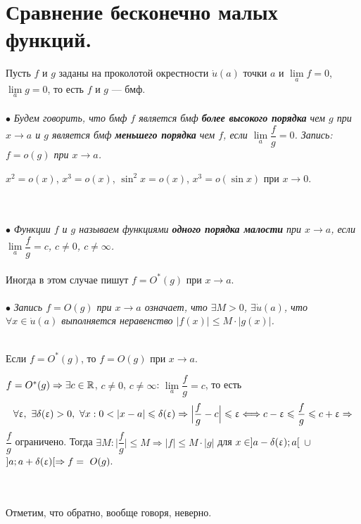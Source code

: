 \section{Сравнение бесконечно малых функций.}
Пусть $f$ и $g$ заданы на проколотой окрестности $\dot{u}(a)$ точки $a$ и $\lim\limits_{a}f = 0$, $\lim\limits_{a}g = 0$, то есть $f$ и $g$ --- бмф.\\\\
$\bullet$ \textit{Будем говорить, что бмф $f$ является бмф \textbf{более высокого порядка} чем $g$ при $x \to a$ и $g$ является бмф \textbf{меньшего порядка} чем $f$, если $\lim\limits_{a}\dfrac{f}{g} = 0$. Запись: $f = o(g)$ при $x\to a$.}\\
\begin{example}
	$x ^ 2 = o (x)$, $x^3 = o(x)$, $\sin ^2 x = o(x)$, $x^3 = o(\sin x)$ при $x\to 0$.
\end{example}\\\\
$\bullet$ \textit{Функции $f$ и $g$ называем функциями \textbf{одного порядка малости} при $x \to a$, если $\lim\limits_{a}\dfrac{f}{g} = c$, $c \ne 0$, $c \ne \infty$.}\\\\
Иногда в этом случае пишут $f = O^*(g)$ при $x \to a$.\\\\
$\bullet$ \textit{Запись $f = O(g)$ при $x\to a$ означает, что $\exists M> 0 $, $\exists\dot{u}(a)$, что $\forall x \in \dot{u}(a)$ выполняется неравенство $|f(x)| \leqslant M\cdot|g(x)|$.}\\\\
\begin{theorem}
	Если $f = O^*(g)$, то $f = O(g)$ при $x\to a$.
\end{theorem}\begin{Proof}
	$f = O^*(g)\Rightarrow \exists c \in \mathbb{R}$, $c \ne 0$, $c \ne \infty$: $\lim\limits_{a}\dfrac{f}{g} = c$, то есть $$\forall \upvarepsilon,\ \exists \delta(\upvarepsilon) > 0,\ \forall x : 0 < |x - a| \leqslant \delta(\upvarepsilon)\Rightarrow \Big|\dfrac{f}{g} - c\Big|\leqslant \upvarepsilon \Longleftrightarrow c - \upvarepsilon \leqslant \dfrac{f}{g} \leqslant c + \upvarepsilon\Rightarrow$$
	$\dfrac{f}{g}$ ограничено. Тогда $\exists M : \Big|\dfrac{f}{g}\Big| \leq M \Rightarrow |f| \leq M \cdot |g|$ для $x \in ]a - \delta(\upvarepsilon); a[$ $\cup$ $]a; a + \delta (\upvarepsilon)[\Rightarrow f =~O(g).$
\end{Proof}\\\\
Отметим, что обратно, вообще говоря, неверно.\\
